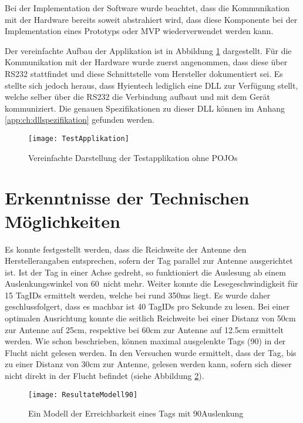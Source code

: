 Bei der Implementation der Software wurde beachtet, dass die Kommunikation mit der Hardware bereits soweit abstrahiert wird, dass diese Komponente bei der Implementation eines Prototyps oder MVP wiederverwendet werden kann.

Der vereinfachte Aufbau der Applikation ist in Abbildung \ref{fig:test_applikation_aufbau} dargestellt. Für die Kommunikation mit der Hardware wurde zuerst angenommen, dass diese über RS232 stattfindet und diese Schnittstelle vom Hersteller dokumentiert sei. Es stellte sich jedoch heraus, dass Hyientech lediglich eine DLL zur Verfügung stellt, welche selber über die RS232 die Verbindung aufbaut und mit dem Gerät kommuniziert. Die genauen Spezifikationen zu dieser DLL können im Anhang \ref{app:ch:dllspezifikation} gefunden werden.

\begin{figure}[h!]
	\centering
	\texttt{[image: TestApplikation]}
	\caption{Vereinfachte Darstellung der Testapplikation ohne POJOs}
	\label{fig:test_applikation_aufbau}
\end{figure}
 
\section{Erkenntnisse der Technischen Möglichkeiten}
Es konnte festgestellt werden, dass die Reichweite der Antenne den Herstellerangaben entsprechen, sofern der Tag parallel zur Antenne ausgerichtet ist. Ist der Tag in einer Achse gedreht, so funktioniert die Auslesung ab einem Auslenkungswinkel von 60\SIUnitSymbolDegree\ nicht mehr. Weiter konnte die Lesegeschwindigkeit für 15 TagIDs ermittelt werden, welche bei rund 350ms liegt. Es wurde daher geschlussfolgert, dass es machbar ist 40 TagIDs pro Sekunde zu lesen.
Bei einer optimalen Ausrichtung konnte die seitlich Reichweite bei einer Distanz von 50cm zur Antenne auf 25cm, respektive bei 60cm zur Antenne auf 12.5cm ermittelt werden. Wie schon beschrieben, können maximal ausgelenkte Tags (90\SIUnitSymbolDegree) in der Flucht nicht gelesen werden. In den Versuchen wurde ermittelt, dass der Tag, bis zu einer Distanz von 30cm zur Antenne, gelesen werden kann, sofern sich dieser nicht direkt in der Flucht befindet (siehe Abbildung \ref{fig:Seitlich90}).

\begin{figure}[htb]
	\centering
	\texttt{[image: ResultateModell90]}
	\caption{Ein Modell der Erreichbarkeit eines Tags mit 90\SIUnitSymbolDegree Auslenkung}
	\label{fig:Seitlich90}
\end{figure}

